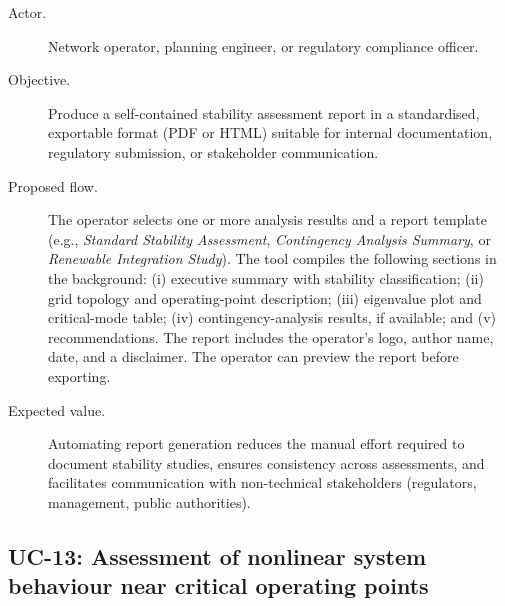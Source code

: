\begin{description}
  \item[Actor.] Network operator, planning engineer, or regulatory compliance officer.
  \item[Objective.] Produce a self-contained stability assessment report in a standardised, exportable format (PDF or HTML) suitable for internal documentation, regulatory submission, or stakeholder communication.
  \item[Proposed flow.] The operator selects one or more analysis results and a report template (e.g., \textit{Standard Stability Assessment}, \textit{Contingency Analysis Summary}, or \textit{Renewable Integration Study}). The tool compiles the following sections in the background: (i) executive summary with stability classification; (ii) grid topology and operating-point description; (iii) eigenvalue plot and critical-mode table; (iv) contingency-analysis results, if available; and (v) recommendations. The report includes the operator's logo, author name, date, and a disclaimer. The operator can preview the report before exporting.
  \item[Expected value.] Automating report generation reduces the manual effort required to document stability studies, ensures consistency across assessments, and facilitates communication with non-technical stakeholders (regulators, management, public authorities).
\end{description}

\subsection{UC-13: Assessment of nonlinear system behaviour near critical operating points}

